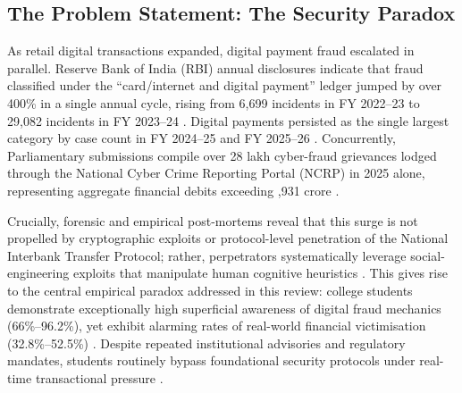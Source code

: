\documentclass[journal,10pt,twocolumn]{IEEEtran}
\begin{document}
\subsection{The Problem Statement: The Security Paradox}
As retail digital transactions expanded, digital payment fraud escalated in parallel. Reserve Bank of India (RBI) annual disclosures indicate that fraud classified under the ``card/internet and digital payment'' ledger jumped by over 400\% in a single annual cycle, rising from 6,699 incidents in FY 2022--23 to 29,082 incidents in FY 2023--24 \cite{bloomberg2024, bs_frauds2024}. Digital payments persisted as the single largest category by case count in FY 2024--25 and FY 2025--26 \cite{bs_cases2025, pti2026}. Concurrently, Parliamentary submissions compile over 28 lakh cyber-fraud grievances lodged through the National Cyber Crime Reporting Portal (NCRP) in 2025 alone, representing aggregate financial debits exceeding ,931 crore \cite{systems2024}.

Crucially, forensic and empirical post-mortems reveal that this surge is not propelled by cryptographic exploits or protocol-level penetration of the National Interbank Transfer Protocol; rather, perpetrators systematically leverage social-engineering exploits that manipulate human cognitive heuristics \cite{exploratio2026, sharma2024}. This gives rise to the central empirical paradox addressed in this review: college students demonstrate exceptionally high superficial awareness of digital fraud mechanics (66\%--96.2\%), yet exhibit alarming rates of real-world financial victimisation (32.8\%--52.5\%) \cite{mukhopadhyay2024, roy2026}. Despite repeated institutional advisories and regulatory mandates, students routinely bypass foundational security protocols under real-time transactional pressure \cite{arxiv2024, emerald2024}.
\end{document}
